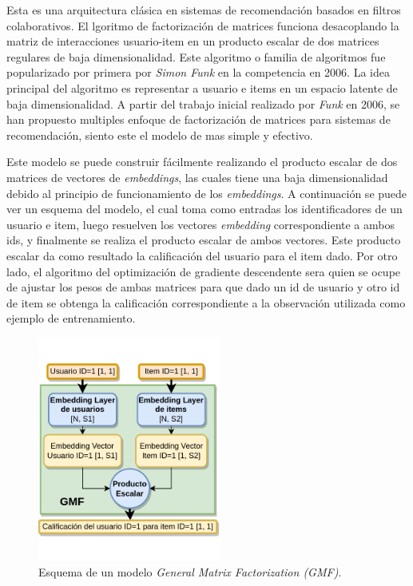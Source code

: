 \documentclass[11pt,a4paper,twoside]{thesis}
\begin{document}
Esta es una arquitectura clásica en sistemas de recomendación basados en
filtros colaborativos. El lgoritmo de factorización de matrices \cite{afm}
funciona desacoplando la matriz de interacciones usuario-item en un producto
escalar de dos matrices regulares de baja dimensionalidad. Este algoritmo o
familia de algoritmos fue popularizado por primera por \textit{Simon Funk} en
la competencia \cite{netflixprize} en 2006. La idea principal del algoritmo es
representar a usuario e items en un espacio latente de baja dimensionalidad. A
partir del trabajo inicial realizado por \textit{Funk} en 2006, se han
propuesto multiples enfoque de factorización de matrices para sistemas de
recomendación, siento este el modelo de mas simple y efectivo.

Este modelo se puede construir fácilmente realizando el producto escalar de dos
matrices de vectores de \textit{embeddings}, las cuales tiene una baja
dimensionalidad debido al principio de funcionamiento de los
\textit{embeddings}. A continuación se puede ver un esquema del modelo, el cual
toma como entradas los identificadores de un usuario e item, luego resuelven
los vectores \textit{embedding} correspondiente a ambos ids, y finalmente se
realiza el producto escalar de ambos vectores. Este producto escalar da como
resultado la calificación del usuario para el item dado. Por otro lado, el
algoritmo del optimización de gradiente descendente sera quien se ocupe de
ajustar los pesos de ambas matrices para que dado un id de usuario y otro id de
item se obtenga la calificación correspondiente a la observación utilizada como
ejemplo de entrenamiento.

\begin{figure}[h!]
	\centering
	\includegraphics[width=6cm]{./images/GMF.png}
	\caption{
		Esquema de un modelo \textit{General Matrix Factorization (GMF)}.
	}
	\label{fig:GMFModel}
\end{figure}
\end{document}

